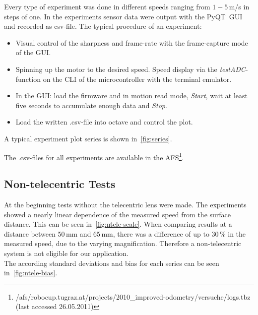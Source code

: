 \documentclass[12pt,a4paper]{article}
\begin{document}
Every type of experiment was done in different speeds ranging from $1-5$\,m/s in steps of one.
In the experiments sensor data were output with the PyQT~GUI and recorded as csv-file.
The typical procedure of an experiment: 
\begin{itemize}
 \item Visual control of the sharpness and frame-rate with the frame-capture mode of the GUI.
 \item Spinning up the motor to the desired speed. Speed display via the \emph{testADC}-function on the CLI of the microcontroller with the terminal emulator.
 \item In the GUI: load the firmware and in motion read mode, \emph{Start}, wait at least five seconds to accumulate enough data and \emph{Stop}.
 \item Load the written .csv-file into octave and control the plot.
\end{itemize}

A typical experiment plot series is shown in~\autoref{fig:series}. 



The .csv-files for all experiments are available in the AFS\footnote{/afs/robocup.tugraz.at/projects/2010\_improved-odometry/versuche/logs.tbz (last accessed 26.05.2011)}.




\subsection{Non-telecentric Tests}

At the beginning tests without the telecentric lens were made.
The experiments showed a nearly linear dependence of the measured speed from the surface distance.
This can be seen in~\autoref{fig:ntele-scale}. 
When comparing results at a distance between 50\,mm and 65\,mm, there was a difference of up to 30\,\% in the measured speed, due to the varying magnification. 
Therefore a non-telecentric system is not  eligible for our application.\\
The according standard deviations and bias for each series can be seen in~\autoref{fig:ntele-bias}.
\end{document}
